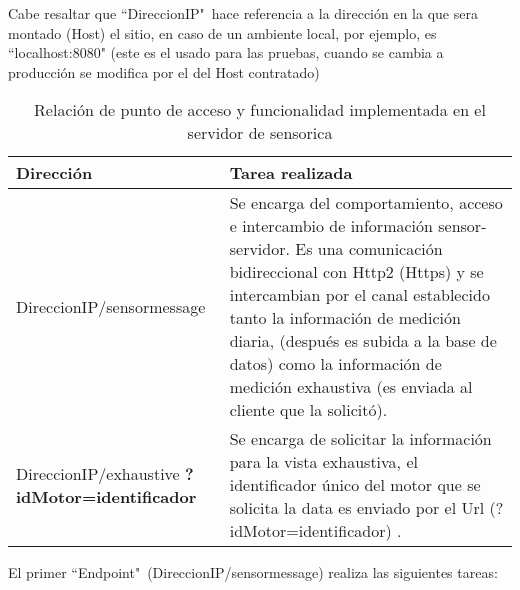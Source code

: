     Cabe resaltar que ``DireccionIP"\ hace referencia a la dirección en la
    que sera montado (Host) el sitio, en caso de un ambiente local, por
    ejemplo, es ``localhost:8080" (este es el usado para las pruebas,
    cuando se cambia a producción se modifica por el del Host contratado)

    \begin{table}[ht]
        \begin{center}
        \caption[Funciones Servidor Sensorica]{ Relación de punto de acceso y
        funcionalidad implementada en el servidor de sensorica}
        \label{tab:ServerSensorica}

            \vspace{0.3cm}
            \begin{tabular}{|p{5cm}|p{10cm}|}
                \hline
                Dirección       & Tarea realizada
                \\\hline\hline
                DireccionIP/sensormessage &
                Se encarga del comportamiento, acceso
                e intercambio de información sensor-servidor. Es una comunicación
                bidireccional con Http2 (Https) y se intercambian por el canal
                establecido tanto la información de medición diaria, (después es
                subida a la base de datos) como la
                información de medición exhaustiva (es enviada al cliente que
                la solicitó).

                \\\hline
                DireccionIP/exhaustive \textbf{?idMotor=identificador}   &
                Se encarga de solicitar la información para la vista exhaustiva,
                el identificador único del motor que se solicita la data
                es enviado por el Url (?idMotor=identificador) .
                \\\hline
            \end{tabular}
        \end{center}
    \end{table}


    El primer ``Endpoint"\ (DireccionIP/sensormessage) realiza las siguientes tareas:

